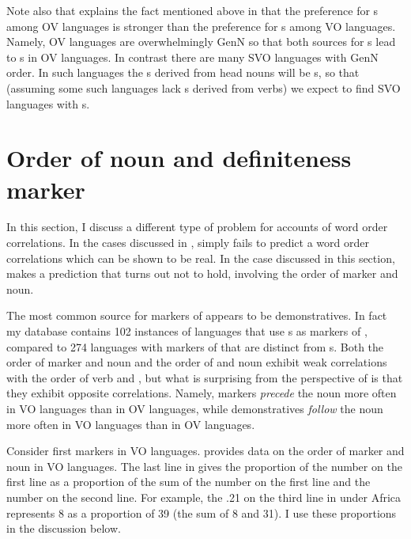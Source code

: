 \documentclass[output=paper]{langsci/langscibook}
\begin{document}
Note also that  explains the fact mentioned above in  that the preference for s among OV languages is stronger than the preference for s among VO languages. Namely, OV languages are overwhelmingly GenN so that both sources for s lead to s in OV languages. In contrast there are many SVO languages with GenN order. In such languages the s derived from head nouns will be s, so that (assuming some such languages lack s derived from verbs) \largerpage we expect to find SVO languages with s.

\section{Order of noun and definiteness marker}\label{sec:dryer:4}

In this section, I discuss a different type of problem for  accounts of word order correlations. In the cases discussed in ,  simply fails to predict a word order correlations which can be shown to be real. In the case discussed in this section,  makes a prediction that turns out not to hold, involving the order of  marker and noun.

The most common  source for markers of  appears to be demonstratives. In fact my database contains 102 instances of languages that use s as markers of , compared to 274 languages with markers of  that are distinct from s. Both the order of  marker and noun and the order of  and noun exhibit weak correlations with the order of verb and , but what is surprising from the perspective of  is that they exhibit opposite correlations. Namely,  markers \textit{precede} the noun more often in VO languages than in OV languages, while demonstratives \textit{follow} the noun more often in VO languages than in OV languages.

Consider first  markers in VO languages.  provides data on the order of  marker and noun in VO languages. The last line in  gives the proportion of the number on the first line as a proportion of the sum of the number on the first line and the number on the second line. For example, the .21 on the third line in  under Africa represents 8 as a proportion of 39 (the sum of 8 and 31). I use these proportions in the discussion below.
\end{document}
